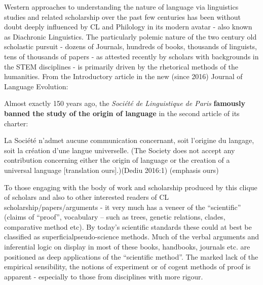 Western approaches to understanding the nature of language via linguistics studies and related scholarship over the past few centuries has been without doubt deeply influenced by CL and Philology in its modern avatar - also known as Diachronic Linguistics. The particularly polemic nature of the two century old scholastic pursuit - dozens of Journals, hundreds of books, thousands of linguists, tens of thousands of papers - as attested recently by scholars with backgrounds in the STEM disciplines - is primarily driven by the rhetorical methods of the humanities. From the Introductory article in the new (since 2016) Journal of Language Evolution:

\vskip 6pt

\begin{myquote}
Almost exactly 150 years ago, the \textit{Société de Linguistique de Paris} \textbf{famously banned the study of the origin of language} in the second article of its charter:
\end{myquote}

\vskip 2pt

\begin{myquote}
La Société n’admet aucune communication concernant, soit l’origine du langage, soit la création d’une langue universelle. (The Society does not accept any contribution concerning either the origin of language or the creation of a universal language [translation ours].)(Dediu 2016:1) (emphasis ours)
\end{myquote}

\vskip 3pt

To those engaging with the body of work and scholarship produced by this clique of scholars and also to other interested readers of CL scholarship/papers/arguments - it very much has a veneer of the “scientific” (claims of “proof”, vocabulary – such as trees, genetic relations, clades, comparative method etc). By today’s scientific standards these could at best be classified as superficialpseudo-science methods. Much of the verbal arguments and inferential logic on display in most of these books, handbooks, journals etc. are positioned as deep applications of the “scientific method”. The marked lack of the empirical sensibility, the notions of experiment or of cogent methods of proof is apparent - especially to those from disciplines with more rigour.

